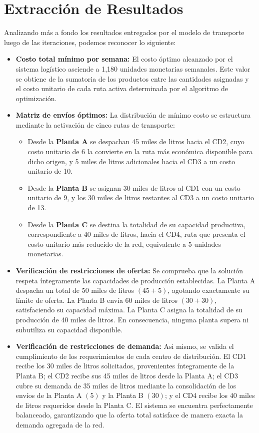\documentclass{article}
\begin{document}
	\section{Extracción de Resultados}

	Analizando más a fondo los resultados entregados por el modelo de transporte luego de las iteraciones, podemos reconocer lo siguiente:

	\begin{itemize}
		\item \textbf{Costo total mínimo por semana:} El costo óptimo alcanzado por el sistema logístico asciende a {1{,}180 unidades monetarias} semanales. Este valor se obtiene de la sumatoria de los productos entre las cantidades asignadas y el costo unitario de cada ruta activa determinada por el algoritmo de optimización.
		
		\item \textbf{Matriz de envíos óptimos:} La distribución de mínimo costo se estructura mediante la activación de cinco rutas de transporte:
		\begin{itemize}
			\item Desde la \textbf{Planta A} se despachan 45 miles de litros hacia el CD2, cuyo costo unitario de 6 la convierte en la ruta más económica disponible para dicho origen, y 5 miles de litros adicionales hacia el CD3 a un costo unitario de 10.
			\item Desde la \textbf{Planta B} se asignan 30 miles de litros al CD1 con un costo unitario de 9, y los 30 miles de litros restantes al CD3 a un costo unitario de 13.
			\item Desde la \textbf{Planta C} se destina la totalidad de su capacidad productiva, correspondiente a 40 miles de litros, hacia el CD4, ruta que presenta el costo unitario más reducido de la red, equivalente a 5 unidades monetarias.
		\end{itemize}
		
		\item \textbf{Verificación de restricciones de oferta:} Se comprueba que la solución respeta íntegramente las capacidades de producción establecidas. La Planta A despacha un total de 50 miles de litros $(45 + 5)$, agotando exactamente su límite de oferta. La Planta B envía 60 miles de litros $(30 + 30)$, satisfaciendo su capacidad máxima. La Planta C asigna la totalidad de su producción de 40 miles de litros. En consecuencia, ninguna planta supera ni subutiliza su capacidad disponible.
		
		\item \textbf{Verificación de restricciones de demanda:} Asi mismo, se valida el cumplimiento de los requerimientos de cada centro de distribución. El CD1 recibe los 30 miles de litros solicitados, provenientes íntegramente de la Planta B; el CD2 recibe sus 45 miles de litros desde la Planta A; el CD3 cubre su demanda de 35 miles de litros mediante la consolidación de los envíos de la Planta A $(5)$ y la Planta B $(30)$; y el CD4 recibe los 40 miles de litros requeridos desde la Planta C. El sistema se encuentra perfectamente balanceado, garantizando que la oferta total satisface de manera exacta la demanda agregada de la red.
	\end{itemize}
\end{document}
